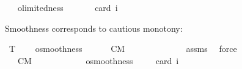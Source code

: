 \begin{isabellebody}
\ \ \ olimitedness\ \ \ \isanewline
\ \ \isamarkupfalse%
\ {\isacharbrackleft}{\kern0pt}card\ i{\isacharequal}{\kern0pt}{}{\isacharbrackright}{\kern0pt}\ %
\ \ \isanewline
%
\isadelimproof
\ \ %
\endisadelimproof
%
\isatagproof
{}\isamarkupfalse%
%
\endisatagproof
{\isafoldproof}%
%
\isadelimproof
%
\endisadelimproof
%
\begin{isamarkuptext}%
Smoothness corresponds to cautious monotony:%
\end{isamarkuptext}\isamarkuptrue%
\isamarkupfalse%
\ T{}{}{\isacharcolon}{\kern0pt}\ \isanewline
\ \ \ osmoothness\ \ \ \isanewline
\ \ \ CM{\isacharprime}{\kern0pt}{\isacharcolon}{\kern0pt}\ {\isachardoublequoteopen}{\isasymlfloor}{\isacharparenleft}{\kern0pt}\ {\isasymodot}{\isacharless}{\kern0pt}{\isasympsi}{\isacharbar}{\kern0pt}{\isasymphi}{\isachargreater}{\kern0pt}\ \isactrlbold {\isasymand}\ {\isasymodot}{\isacharless}{\kern0pt}{\isasymchi}{\isacharbar}{\kern0pt}{\isasymphi}{\isachargreater}{\kern0pt}\ {\isacharparenright}{\kern0pt}\ \isactrlbold {\isasymrightarrow}\ {\isasymodot}{\isacharless}{\kern0pt}{\isasymchi}{\isacharbar}{\kern0pt}{\isasymphi}\isactrlbold {\isasymand}{\isasympsi}{\isachargreater}{\kern0pt}{\isasymrfloor}{\isachardoublequoteclose}\ \ \ \isanewline
%
\isadelimproof
\ \ %
\endisadelimproof
%
\isatagproof
{}\isamarkupfalse%
\ assms\ \isamarkupfalse%
\ force%
\endisatagproof
{\isafoldproof}%
%
\isadelimproof
\ \isanewline
%
\endisadelimproof
\isanewline
\isanewline
{}\isamarkupfalse%
\ \isanewline
\ \ \ CM{\isacharcolon}{\kern0pt}\ {\isachardoublequoteopen}{\isasymlfloor}{\isacharparenleft}{\kern0pt}\ {\isasymodot}{\isacharless}{\kern0pt}{\isasympsi}{\isacharbar}{\kern0pt}{\isasymphi}{\isachargreater}{\kern0pt}\ \isactrlbold {\isasymand}\ {\isasymodot}{\isacharless}{\kern0pt}{\isasymchi}{\isacharbar}{\kern0pt}{\isasymphi}{\isachargreater}{\kern0pt}\ {\isacharparenright}{\kern0pt}\ \isactrlbold {\isasymrightarrow}\ {\isasymodot}{\isacharless}{\kern0pt}{\isasymchi}{\isacharbar}{\kern0pt}{\isasymphi}\isactrlbold {\isasymand}{\isasympsi}{\isachargreater}{\kern0pt}{\isasymrfloor}{\isachardoublequoteclose}\ \isanewline
\ \ \ \ osmoothness\ \isanewline
\ \ \isamarkupfalse%
\ {\isacharbrackleft}{\kern0pt}card\ i{\isacharequal}{\kern0pt}{}{\isacharbrackright}{\kern0pt}\ %
\end{isabellebody}
